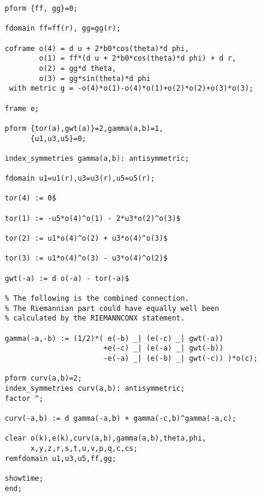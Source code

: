 {\begin{verbatim}
pform {ff, gg}=0;

fdomain ff=ff(r), gg=gg(r);

coframe o(4) = d u + 2*b0*cos(theta)*d phi,
        o(1) = ff*(d u + 2*b0*cos(theta)*d phi) + d r,
        o(2) = gg*d theta,
        o(3) = gg*sin(theta)*d phi
 with metric g = -o(4)*o(1)-o(4)*o(1)+o(2)*o(2)+o(3)*o(3);

frame e;

pform {tor(a),gwt(a)}=2,gamma(a,b)=1,
      {u1,u3,u5}=0;

index_symmetries gamma(a,b): antisymmetric;

fdomain u1=u1(r),u3=u3(r),u5=u5(r);

tor(4) := 0$

tor(1) := -u5*o(4)^o(1) - 2*u3*o(2)^o(3)$

tor(2) := u1*o(4)^o(2) + u3*o(4)^o(3)$

tor(3) := u1*o(4)^o(3) - u3*o(4)^o(2)$

gwt(-a) := d o(-a) - tor(-a)$

% The following is the combined connection.
% The Riemannian part could have equally well been
% calculated by the RIEMANNCONX statement.

gamma(-a,-b) := (1/2)*( e(-b) _| (e(-c) _| gwt(-a))
                       +e(-c) _| (e(-a) _| gwt(-b))
                       -e(-a) _| (e(-b) _| gwt(-c)) )*o(c);

pform curv(a,b)=2;
index_symmetries curv(a,b): antisymmetric;
factor ^;

curv(-a,b) := d gamma(-a,b) + gamma(-c,b)^gamma(-a,c);

clear o(k),e(k),curv(a,b),gamma(a,b),theta,phi,
      x,y,z,r,s,t,u,v,p,q,c,cs;
remfdomain u1,u3,u5,ff,gg;

showtime;
end;
\end{verbatim}
}
